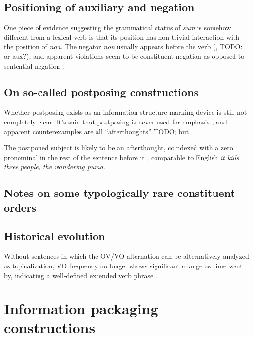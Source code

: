 \documentclass[a4paper, oneside, 12pt]{report}
\newcommand*{\citesec}[1]{\S~{#1}}
\newcommand*{\citepage}[1]{p.~{#1}}
\newcommand{\form}[1]{\emph{#1}}
\begin{document}
\subsection{Positioning of auxiliary and negation}\label{sec:constituent-order.aux-neg}

One piece of evidence suggesting the grammatical status of \form{sum} 
is somehow different from a lexical verb 
is that its position has non-trivial interaction 
with the position of \form{non}.
The negator \form{non} usually appears before the verb 
(\citealt[\citesec{1.5}]{danckaert2017development}, TODO: or aux?),
and apparent violations seem to be constituent negation 
as opposed to sentential negation \citep[\citepage{43}]{danckaert2017development}.

\subsection{On so-called postposing constructions}

Whether postposing exists as an information structure marking device 
is still not completely clear. 
It's said that postposing is never used for emphasis \citep[\citepage{395}]{allen1903allen},
and apparent counterexamples are all ``afterthoughts'' TODO;
but 

The postponed subject is likely to be an afterthought, 
coindexed with a zero pronominal 
in the rest of the sentence before it
\citet[\citepage{87}]{devine2006latin},
comparable to English \form{it kills three people, the wandering puma}.

\subsection{Notes on some typologically rare constituent orders}


\subsection{Historical evolution}\label{sec:constituent-order.history}

Without sentences in which the OV/VO alternation 
can be alternatively analyzed as topicalization,
VO frequency no longer shows significant change as time went by,
indicating a well-defined extended verb phrase \citep[\citesec{1.5}, \citepage{29}]{danckaert2017development}.

\section{Information packaging constructions}
\end{document}
